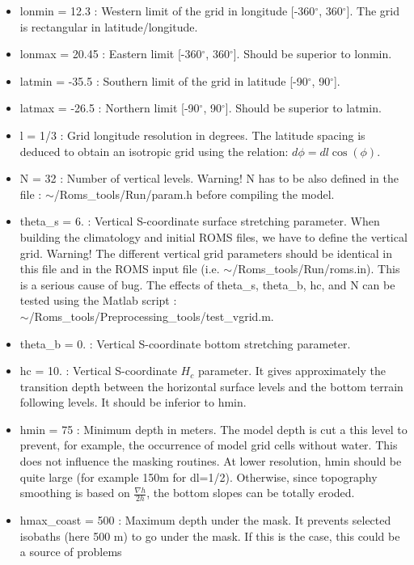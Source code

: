 \begin{itemize}
\item lonmin =  12.3 : Western limit of the grid in longitude [-360$^\circ$, 360$^\circ$]. 
The grid is rectangular in latitude/longitude.
\item lonmax = 20.45 : Eastern limit [-360$^\circ$, 360$^\circ$]. 
Should be superior to lonmin.
\item latmin = -35.5 : Southern limit of the grid in latitude [-90$^\circ$, 90$^\circ$].
\item latmax = -26.5 : Northern limit [-90$^\circ$, 90$^\circ$].
Should be superior to latmin.
\item l = 1/3 : Grid longitude resolution in degrees. The latitude spacing is deduced to
obtain an isotropic grid using the relation: $d\phi=dl\cos(\phi)$.
\item N = 32 : Number of vertical levels. Warning! N has to be also 
defined in the file : $\sim$/Roms\_tools/Run/param.h before compiling
the model.
\item theta\_s = 6. : Vertical S-coordinate surface stretching parameter. 
When building the climatology and initial ROMS files, we have to define
the vertical grid. Warning! The different vertical grid parameters should 
be identical in this file and in the ROMS input file (i.e. 
$\sim$/Roms\_tools/Run/roms.in).
This is a serious cause of bug.
The effects of theta\_s, theta\_b, hc, and N can be tested 
using the Matlab script : \\
$\sim$/Roms\_tools/Preprocessing\_tools/test\_vgrid.m.
\item theta\_b = 0. : Vertical S-coordinate bottom stretching parameter.
\item hc      = 10. : Vertical S-coordinate $H_c$ parameter. It gives approximately the
transition depth between the horizontal surface levels and the bottom terrain following
levels. It should be inferior to hmin.
\item hmin = 75 : Minimum depth in meters. The model depth is cut a this level 
to prevent, for example, the occurrence of model grid cells without water.
This does not influence the masking routines. At lower resolution, hmin should be 
quite large (for example 150m for dl=1/2). Otherwise, since topography smoothing 
is based on $\frac{\nabla h}{2h}$, the bottom slopes can be totally eroded.
\item hmax\_coast = 500 : Maximum depth under the mask. It prevents selected
isobaths (here 500 m) to go under the mask. If this is the case, 
this could be a source of problems

\end{itemize}
